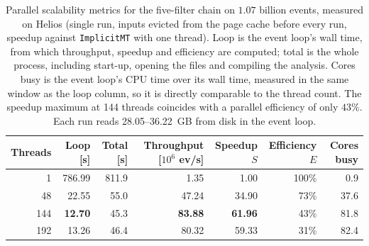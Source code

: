 \begin{table}[htbp]
\centering
\caption{Parallel scalability metrics for the five-filter chain on $1.07$ billion events, measured on Helios (single run, inputs evicted from the page cache before every run, speedup against \texttt{ImplicitMT} with one thread). Loop is the event loop's wall time, from which throughput, speedup and efficiency are computed; total is the whole process, including start-up, opening the files and compiling the analysis. Cores busy is the event loop's CPU time over its wall time, measured in the same window as the loop column, so it is directly comparable to the thread count. The speedup maximum at 144 threads coincides with a parallel efficiency of only $43\%$. Each run reads 28.05--36.22~GB from disk in the event loop.}
\label{tab:scalability-chain}
\setlength{\tabcolsep}{5pt}
\begin{tabular}{rrrrrrr}
\toprule
Threads & Loop [s] & Total [s] & Throughput [$10^6$ ev/s] & Speedup $S$ & Efficiency $E$ & Cores busy \\
\midrule
 1 & 786.99 & 811.9 & 1.35 & 1.00 & 100\% & 0.9 \\
48 & 22.55 & 55.0 & 47.24 & 34.90 & 73\% & 37.6 \\
144 & \textbf{12.70} & 45.3 & \textbf{83.88} & \textbf{61.96} & 43\% & 81.8 \\
192 & 13.26 & 46.4 & 80.32 & 59.33 & 31\% & 82.4 \\
\bottomrule
\end{tabular}
\end{table}
